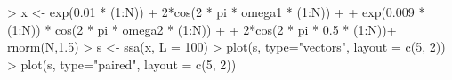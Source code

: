 \begin{CodeChunk}
\begin{CodeInput}


> x <- exp(0.01 * (1:N)) + 2*cos(2 * pi * omega1 * (1:N)) +  
+   exp(0.009 * (1:N)) * cos(2 * pi * omega2 * (1:N)) + 
+   2*cos(2 * pi * 0.5 * (1:N))+ rnorm(N,1.5)
> s <- ssa(x, L = 100)
> plot(s, type="vectors", layout = c(5, 2))
> plot(s, type="paired", layout = c(5, 2))
\end{CodeInput}

\end{CodeChunk}